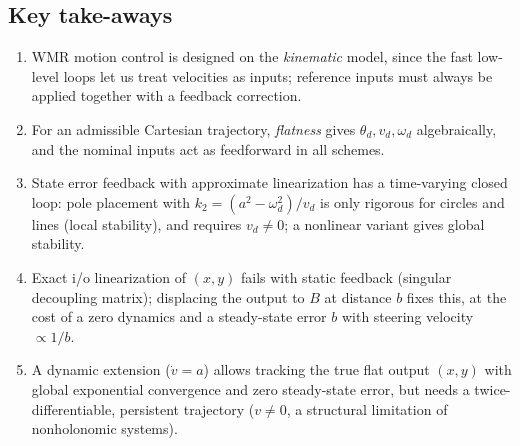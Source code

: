 \documentclass[11pt,a4paper]{article}
\newcommand{\vd}{v_d}
\newcommand{\omd}{\omega_d}
\theoremstyle{plain}
\theoremstyle{definition}
\theoremstyle{remark}
\begin{document}
\subsection*{Key take-aways}
\begin{enumerate}
\item WMR motion control is designed on the \emph{kinematic} model, since the fast low-level loops let us treat velocities as inputs; reference inputs must always be applied together with a feedback correction.
\item For an admissible Cartesian trajectory, \emph{flatness} gives $\theta_d,\vd,\omd$ algebraically, and the nominal inputs act as feedforward in all schemes.
\item State error feedback with approximate linearization has a time-varying closed loop: pole placement with $k_2=(a^2-\omd^2)/\vd$ is only rigorous for circles and lines (local stability), and requires $\vd\neq0$; a nonlinear variant gives global stability.
\item Exact i/o linearization of $(x,y)$ fails with static feedback (singular decoupling matrix); displacing the output to $B$ at distance $b$ fixes this, at the cost of a zero dynamics and a steady-state error $b$ with steering velocity $\propto1/b$.
\item A dynamic extension ($\dot v=a$) allows tracking the true flat output $(x,y)$ with global exponential convergence and zero steady-state error, but needs a twice-differentiable, persistent trajectory ($v\neq0$, a structural limitation of nonholonomic systems).
\end{enumerate}
\end{document}
